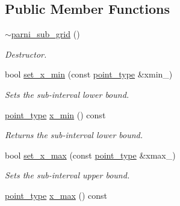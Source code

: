 \subsection*{Public Member Functions}
\begin{DoxyCompactItemize}
\item 
\hypertarget{a00397_af169354f712a50c182fdb15e87fdfbf0}{}\hyperlink{a00397_af169354f712a50c182fdb15e87fdfbf0}{$\sim$parni\+\_\+sub\+\_\+grid} ()\label{a00397_af169354f712a50c182fdb15e87fdfbf0}

\begin{DoxyCompactList}\small\item\em Destructor. \end{DoxyCompactList}\item 
\hypertarget{a00397_ad283e60b7b3cf6516fa5453b9ddd2469}{}bool \hyperlink{a00397_ad283e60b7b3cf6516fa5453b9ddd2469}{set\+\_\+x\+\_\+min} (const \hyperlink{a00579}{point\+\_\+type} \&xmin\+\_\+)\label{a00397_ad283e60b7b3cf6516fa5453b9ddd2469}

\begin{DoxyCompactList}\small\item\em Sets the sub-\/interval lower bound. \end{DoxyCompactList}\item 
\hypertarget{a00397_ae3ef8f0e20313ca18d1703999a5b0b23}{}\hyperlink{a00579}{point\+\_\+type} \hyperlink{a00397_ae3ef8f0e20313ca18d1703999a5b0b23}{x\+\_\+min} () const \label{a00397_ae3ef8f0e20313ca18d1703999a5b0b23}

\begin{DoxyCompactList}\small\item\em Returns the sub-\/interval lower bound. \end{DoxyCompactList}\item 
\hypertarget{a00397_a9de8dc23ae2108a18a87c029ca34e746}{}bool \hyperlink{a00397_a9de8dc23ae2108a18a87c029ca34e746}{set\+\_\+x\+\_\+max} (const \hyperlink{a00579}{point\+\_\+type} \&xmax\+\_\+)\label{a00397_a9de8dc23ae2108a18a87c029ca34e746}

\begin{DoxyCompactList}\small\item\em Sets the sub-\/interval upper bound. \end{DoxyCompactList}\item 
\hypertarget{a00397_a021d3be763d4b1f8ed43c3c995cec60e}{}\hyperlink{a00579}{point\+\_\+type} \hyperlink{a00397_a021d3be763d4b1f8ed43c3c995cec60e}{x\+\_\+max} () const \label{a00397_a021d3be763d4b1f8ed43c3c995cec60e}


\end{DoxyCompactItemize}
